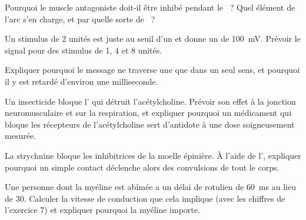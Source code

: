 \begin{exercise}[$\star\star$]\label{exo:g12:stretch-reflex:9}
Pourquoi le muscle antagoniste doit-il être inhibé pendant le
~? Quel élément de l'arc s'en charge, et par quelle sorte de
~?
\end{exercise}

\begin{exercise}[$\star\star$]\label{exo:g12:stretch-reflex:10}
Un stimulus de 2 unités est juste au seuil d'un  et donne un
 de \qty{100}{mV}. Prévoir le signal pour des
stimulus de 1, 4 et 8 unités.
\end{exercise}

\begin{exercise}[$\star\star$]\label{exo:g12:stretch-reflex:11}
Expliquer pourquoi le message ne traverse une  que dans un seul
sens, et pourquoi il y est retardé d'environ une milliseconde.
\end{exercise}

\begin{exercise}[$\star\star\star$]\label{exo:g12:stretch-reflex:12}
Un insecticide bloque l' qui détruit l'acétylcholine. Prévoir
son effet à la jonction neuromusculaire et sur la respiration, et
expliquer pourquoi un médicament qui bloque les récepteurs de
l'acétylcholine sert d'antidote à une dose soigneusement mesurée.
\end{exercise}

\begin{exercise}[$\star\star\star$]\label{exo:g12:stretch-reflex:13}
La strychnine bloque les  inhibitrices de la moelle épinière.
À l'aide de l', expliquer pourquoi un simple contact
déclenche alors des convulsions de tout le corps.
\end{exercise}

\begin{exercise}[$\star\star\star$]\label{exo:g12:stretch-reflex:14}
Une personne dont la myéline est abîmée a un délai de  rotulien
de \qty{60}{ms} au lieu de 30. Calculer la vitesse de conduction que
cela implique (avec les chiffres de l'exercice 7) et expliquer
pourquoi la myéline importe.
\end{exercise}

